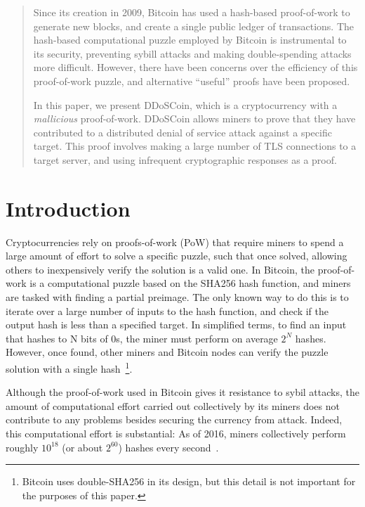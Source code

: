 


\begin{abstract}

Since its creation in 2009, Bitcoin has used a hash-based proof-of-work to
generate new blocks, and create a single public ledger of transactions. The
hash-based computational puzzle employed by Bitcoin is instrumental to its
security, preventing sybill attacks and making double-spending attacks more
difficult. However, there have been concerns over the efficiency of this
proof-of-work puzzle, and alternative ``useful'' proofs have been proposed.

In this paper, we present DDoSCoin, which is a cryptocurrency with a
\emph{mallicious} proof-of-work. DDoSCoin allows miners to prove that they have
contributed to a distributed denial of service attack against a specific target.
This proof involves making a large number of TLS connections to a target server,
and using infrequent cryptographic responses as a proof.



\end{abstract}




\section{Introduction}

Cryptocurrencies rely on proofs-of-work (PoW) that
require miners to spend a large amount of effort to solve a specific puzzle,
such that once solved, allowing others to inexpensively verify the solution is a
valid one. In Bitcoin, the proof-of-work is a computational puzzle based on the
SHA256 hash function, and miners are tasked with finding a partial preimage. The
only known way to do this is to iterate over a large number of inputs to the
hash function, and check if the output hash is less than a specified target. In
simplified terms, to find an input that hashes to N bits of 0s, the miner must
perform on average $2^{N}$ hashes. However, once found, other miners and Bitcoin
nodes can verify the puzzle solution with
a single hash~\footnote{Bitcoin uses double-SHA256 in its design, but this
detail is not important for the purposes of this paper.}.


Although the proof-of-work used in Bitcoin gives it resistance to sybil attacks,
the amount of computational effort carried out collectively by its miners does
not contribute to any problems besides securing the currency from attack.
Indeed, this computational effort is substantial: As of 2016, miners
collectively perform roughly $10^{18}$ (or about $2^{60}$) hashes every
second~\cite{blockchain}.

